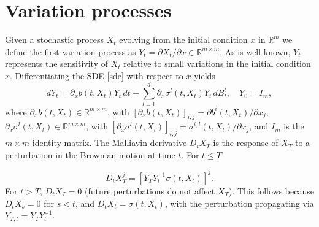 \documentclass[]{interact}
\newcommand{\R}{\mathbb{R}}
\newcommand{\1}{\mathbf{1}}
\theoremstyle{plain}%
\theoremstyle{definition}
\theoremstyle{remark}
\numberwithin{equation}{section}
\begin{document}
\section{Variation processes}
\label{sec:variation}

Given a stochastic process $X_t$ evolving from the initial condition $x$ in $\mathbb{R}^m$ we define the first variation process as \(Y_t = \partial X_t/\partial x \in \R^{m \times m}\). As is well known, $Y_t$ represents the sensitivity of \(X_t\) relative to small variations in the initial condition \(x\). Differentiating the SDE \eqref{sde} with respect to \(x\) yields
\[
dY_t = \partial_x b(t, X_t) Y_t \, dt + \sum_{l=1}^d \partial_x \sigma^l(t, X_t) Y_t \, dB_t^l, \quad Y_0 = I_m,
\]
where \(\partial_x b(t, X_t) \in \R^{m \times m}\), with \(\left[ \partial_x b(t, X_t) \right]_{i,j} = {\partial b^i(t, X_t)}/{\partial x_j}\), \(\partial_x \sigma^l(t, X_t) \in \R^{m \times m}\), with \(\left[ \partial_x \sigma^l(t, X_t) \right]_{i,j} = {\sigma^{i,l}(t, X_t)}/{\partial x_j}\), and \(I_m\) is the \(m \times m\) identity matrix.
%
The Malliavin derivative \(D_t X_T\) is the response of \(X_T\) to a perturbation in the Brownian motion at time \(t\). For \(t \leq T\)

\[
D_t X_T^j = \left[ Y_T Y_t^{-1} \sigma(t, X_t) \right]^j.
\]
For \(t > T\), \(D_t X_T = 0\) (future perturbations do not affect \(X_T\)). This follows because \(D_t X_s = 0\) for \(s < t\), and \(D_t X_t = \sigma(t, X_t)\), with the perturbation propagating via \(Y_{T,t} = Y_T Y_t^{-1}\).
\end{document}
